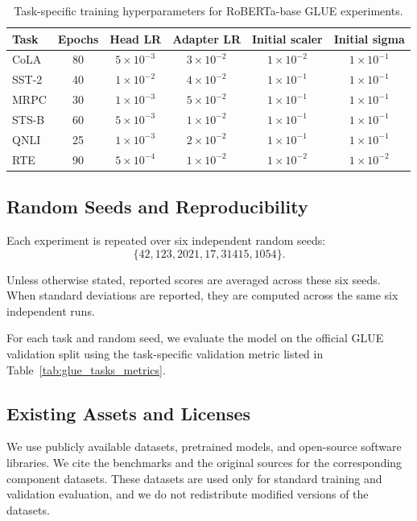 \begin{table}[h]
\centering
\caption{Task-specific training hyperparameters for RoBERTa-base GLUE experiments.}
\label{tab:task_hyperparams}
\begin{tabular}{lccccc}
\toprule
Task & Epochs & Head LR & Adapter LR & Initial scaler & Initial sigma \\
\midrule
CoLA  & 80 & $5 \times 10^{-3}$ & $3 \times 10^{-2}$ & $1 \times 10^{-2}$ & $1 \times 10^{-1}$ \\
SST-2 & 40 & $1 \times 10^{-2}$ & $4 \times 10^{-2}$ & $1 \times 10^{-1}$ & $1 \times 10^{-1}$ \\
MRPC  & 30 & $1 \times 10^{-3}$ & $5 \times 10^{-2}$ & $1 \times 10^{-1}$ & $1 \times 10^{-1}$ \\
STS-B & 60 & $5 \times 10^{-3}$ & $1 \times 10^{-2}$ & $1 \times 10^{-1}$ & $1 \times 10^{-1}$ \\
QNLI  & 25 & $1 \times 10^{-3}$ & $2 \times 10^{-2}$ & $1 \times 10^{-1}$ & $1 \times 10^{-1}$ \\
RTE   & 90 & $5 \times 10^{-4}$ & $1 \times 10^{-2}$ & $1 \times 10^{-2}$ & $1 \times 10^{-2}$ \\
\bottomrule
\end{tabular}
\end{table}


\subsection{Random Seeds and Reproducibility}

Each experiment is repeated over six independent random seeds:
\[
\{42, 123, 2021, 17, 31415, 1054\}.
\]

Unless otherwise stated, reported scores are averaged across these six seeds. When standard deviations are reported, they are computed across the same six independent runs.

For each task and random seed, we evaluate the model on the official GLUE validation split using the task-specific validation metric listed in Table~\ref{tab:glue_tasks_metrics}.

\subsection{Existing Assets and Licenses}
\label{app:assets_licenses}

We use publicly available datasets, pretrained models, and open-source software
libraries. We cite the benchmarks and the original sources for the corresponding component datasets. These datasets are used only for standard training and validation evaluation, and we do not redistribute modified versions
of the datasets.

